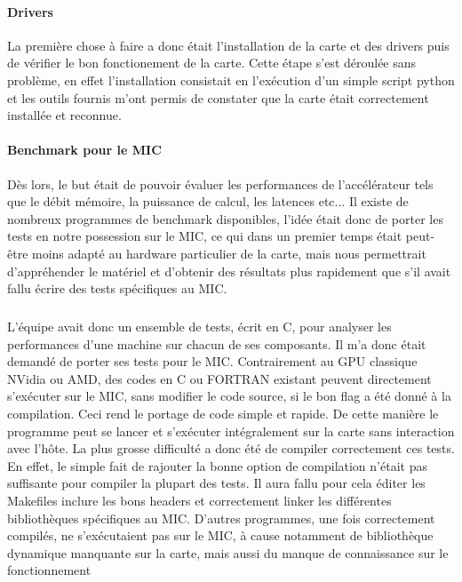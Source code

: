\documentclass{article}
\begin{document}
				\paragraph{Drivers}
				La première chose à faire a donc était l'installation de la carte et des drivers puis de vérifier le bon
				fonctionement de la carte. Cette étape s'est déroulée sans problème, en effet l'installation consistait en 
				l'exécution d'un simple script python et les outils fournis m'ont permis de constater que la carte était
				correctement installée et reconnue.
				\paragraph{Benchmark pour le MIC}
				Dès lors, le but était de pouvoir évaluer les performances de l'accélérateur tels que le débit mémoire,
				la puissance de calcul, les latences etc... \newline
				Il existe de nombreux programmes de benchmark disponibles, l'idée était donc de porter les tests en notre
				possession sur le MIC, ce qui dans un premier temps était peut-être moins adapté au hardware particulier
				de la carte, mais nous permettrait d'appréhender le matériel et d'obtenir des résultats plus rapidement 
				que s'il avait fallu écrire des tests spécifiques au MIC.
					\subparagraph{}
					L'équipe avait donc un ensemble de tests, écrit en C, pour analyser les performances d'une machine sur 
					chacun de ses composants. Il m'a donc était demandé de porter ses tests pour le MIC. \newline
					Contrairement au GPU classique NVidia ou AMD, des codes en C ou FORTRAN existant peuvent directement
					s'exécuter sur le MIC, sans modifier le code source, si le bon flag a été donné à la compilation. Ceci 
					rend le portage de code simple et rapide. De cette manière le programme peut se lancer et s'exécuter 
					intégralement sur la carte sans interaction avec l'hôte.\newline
					La plus grosse difficulté a donc été de compiler correctement ces tests. En effet, le simple fait de rajouter 
					la bonne option de compilation n'était pas suffisante pour compiler la plupart des tests. Il aura fallu pour cela éditer 
					les Makefiles inclure les bons headers et correctement linker les différentes bibliothèques spécifiques au 
					MIC. D'autres programmes, une fois correctement compilés, ne s'exécutaient pas sur le MIC, à cause notamment 
					de bibliothèque dynamique manquante sur la carte, mais aussi du manque de connaissance sur le fonctionnement 
\end{document}
